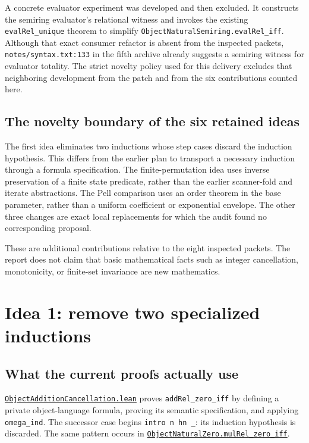 \documentclass[11pt,letterpaper]{article}
\newcommand{\code}[1]{\nolinkurl{#1}}
\newcommand{\repo}[2]{\href{https://github.com/VladimirReshetnikov/ProveIt/blob/b310142330df89e48413c8fce62e7de223e1c7d5/#1}{#2}}
\newcommand{\modulelink}[2]{\repo{Computability/DiophantineConsistency/Lean/DiophantineConsistency/#1.lean}{#2}}
\begin{document}
A concrete evaluator experiment was developed and then excluded. It constructs
the semiring evaluator's relational witness and invokes the existing
\code{evalRel_unique} theorem to simplify \code{ObjectNaturalSemiring.evalRel_iff}.
Although that exact consumer refactor is absent from the inspected packets,
\code{notes/syntax.txt:133} in the fifth archive already suggests a semiring
witness for evaluator totality. The strict novelty policy used for this
delivery excludes that neighboring development from the patch and from the
six contributions counted here.

\subsection{The novelty boundary of the six retained ideas}

The first idea eliminates two inductions whose step cases discard the
induction hypothesis. This differs from the earlier plan to transport a
necessary induction through a formula specification. The finite-permutation
idea uses inverse preservation of a finite state predicate, rather than the
earlier scanner-fold and iterate abstractions. The Pell comparison uses an
order theorem in the base parameter, rather than a uniform coefficient or
exponential envelope. The other three changes are exact local replacements
for which the audit found no corresponding proposal.

These are additional contributions relative to the eight inspected packets.
The report does not claim that basic mathematical facts such as integer
cancellation, monotonicity, or finite-set invariance are new mathematics.

\section{Idea 1: remove two specialized inductions}
\label{sec:no-induction}

\subsection{What the current proofs actually use}

\modulelink{ObjectAdditionCancellation}{\code{ObjectAdditionCancellation.lean}}
proves \code{addRel_zero_iff} by defining a private object-language formula,
proving its semantic specification, and applying \code{omega_ind}. The
successor case begins \code{intro n hn _}: its induction hypothesis is
discarded. The same pattern occurs in
\modulelink{ObjectNaturalZero}{\code{ObjectNaturalZero.mulRel_zero_iff}}.
\end{document}
